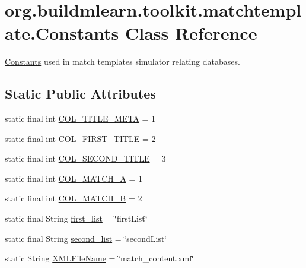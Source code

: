 \hypertarget{classorg_1_1buildmlearn_1_1toolkit_1_1matchtemplate_1_1Constants}{}\section{org.\+buildmlearn.\+toolkit.\+matchtemplate.\+Constants Class Reference}
\label{classorg_1_1buildmlearn_1_1toolkit_1_1matchtemplate_1_1Constants}


\hyperlink{classorg_1_1buildmlearn_1_1toolkit_1_1matchtemplate_1_1Constants}{Constants} used in match template\textquotesingle{}s simulator relating databases.  


\subsection*{Static Public Attributes}
\begin{DoxyCompactItemize}
\item 
static final int \hyperlink{classorg_1_1buildmlearn_1_1toolkit_1_1matchtemplate_1_1Constants_af82d7727f539cea18ae0f7aef5ccab17}{C\+O\+L\+\_\+\+T\+I\+T\+L\+E\+\_\+\+M\+E\+TA} = 1
\item 
static final int \hyperlink{classorg_1_1buildmlearn_1_1toolkit_1_1matchtemplate_1_1Constants_a00cf8a9b447b029b06e0632de9ee8143}{C\+O\+L\+\_\+\+F\+I\+R\+S\+T\+\_\+\+T\+I\+T\+LE} = 2
\item 
static final int \hyperlink{classorg_1_1buildmlearn_1_1toolkit_1_1matchtemplate_1_1Constants_ace90f6755a29f8c2c02856de1b050a43}{C\+O\+L\+\_\+\+S\+E\+C\+O\+N\+D\+\_\+\+T\+I\+T\+LE} = 3
\item 
static final int \hyperlink{classorg_1_1buildmlearn_1_1toolkit_1_1matchtemplate_1_1Constants_a03c6a821d7de22b420059b1087e19e2a}{C\+O\+L\+\_\+\+M\+A\+T\+C\+H\+\_\+A} = 1
\item 
static final int \hyperlink{classorg_1_1buildmlearn_1_1toolkit_1_1matchtemplate_1_1Constants_a4068a0ba559b1980b2f43b37fe895b57}{C\+O\+L\+\_\+\+M\+A\+T\+C\+H\+\_\+B} = 2
\item 
static final String \hyperlink{classorg_1_1buildmlearn_1_1toolkit_1_1matchtemplate_1_1Constants_a5cce27593b60e7244c7662794ac830aa}{first\+\_\+list} = \char`\"{}first\+List\char`\"{}
\item 
static final String \hyperlink{classorg_1_1buildmlearn_1_1toolkit_1_1matchtemplate_1_1Constants_a445978428a1b2e1f2a2ca9fb7bacbc67}{second\+\_\+list} = \char`\"{}second\+List\char`\"{}
\item 
static String \hyperlink{classorg_1_1buildmlearn_1_1toolkit_1_1matchtemplate_1_1Constants_aaa445a567c19f55fa2ee134f604db9c4}{X\+M\+L\+File\+Name} = \char`\"{}match\+\_\+content.\+xml\char`\"{}
\end{DoxyCompactItemize}


